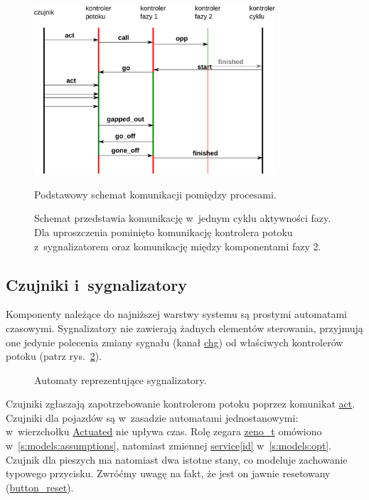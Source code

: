\documentclass{pracamgr}
\newcommand{\imgr}[1]{rys.~\ref{#1}}
\theoremstyle{plain}
\begin{document}
\begin{figure}
  \centering
  \includegraphics[width=0.8\textwidth]{img/models-msc}
  \caption{Podstawowy schemat komunikacji pomiędzy procesami.}
  \caption*{Schemat przedstawia komunikację w~jednym cyklu aktywności
    fazy. Dla uproszczenia pominięto komunikację kontrolera potoku
    z~sygnalizatorem oraz komunikację między komponentami fazy 2.}
  \label{img:models:msc}
\end{figure}

\subsection{Czujniki i~sygnalizatory}
\label{ss:models:models:dets}
Komponenty należące do najniższej warstwy systemu są prostymi
automatami czasowymi.
Sygnalizatory nie zawierają żadnych elementów sterowania, przyjmują
one jedynie polecenia zmiany sygnału (kanał \url{chg}) od właściwych
kontrolerów potoku (patrz \imgr{img:lights}).

\begin{figure}
  \centering
  \hspace{1cm}
  \caption{Automaty reprezentujące sygnalizatory.}
  \label{img:lights}
\end{figure}

Czujniki zgłaszają zapotrzebowanie kontrolerom potoku poprzez
komunikat \url{act}. Czujniki dla pojazdów są w~zasadzie automatami
jednostanowymi: w~wierzchołku \url{Actuated} nie upływa czas. Rolę
zegara \url{zeno_t} omówiono w~\ref{s:models:assumptions}, natomiast
zmiennej \url{service[id]} w~\ref{s:models:opt}. Czujnik dla pieszych
ma natomiast dwa istotne stany, co modeluje zachowanie typowego
przycisku. Zwróćmy uwagę na fakt, że jest on jawnie resetowany
(\url{button_reset}).
\end{document}
